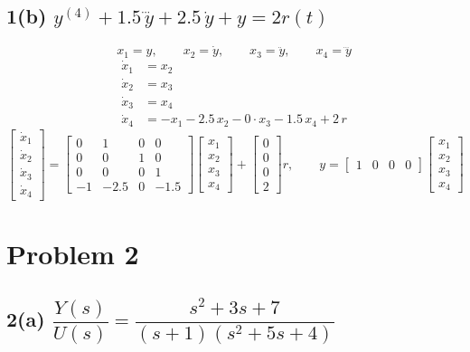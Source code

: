 \documentclass[11pt]{article}
\begin{document}
\subsection*{1(b) \quad $y^{(4)} + 1.5\,\dddot{y} + 2.5\,\dot{y} + y = 2r(t)$}

\[
x_1 = y, \qquad x_2 = \dot{y}, \qquad x_3 = \ddot{y}, \qquad x_4 = \dddot{y}
\]
\begin{align*}
\dot{x}_1 &= x_2\\
\dot{x}_2 &= x_3\\
\dot{x}_3 &= x_4\\
\dot{x}_4 &= -x_1 - 2.5\,x_2 - 0\cdot x_3 - 1.5\,x_4 + 2\,r
\end{align*}
\[
\begin{bmatrix}\dot{x}_1\\ \dot{x}_2\\ \dot{x}_3\\ \dot{x}_4\end{bmatrix}
=
\begin{bmatrix}0 & 1 & 0 & 0\\ 0 & 0 & 1 & 0\\ 0 & 0 & 0 & 1\\ -1 & -2.5 & 0 & -1.5\end{bmatrix}
\begin{bmatrix}x_1\\ x_2\\ x_3\\ x_4\end{bmatrix}
+
\begin{bmatrix}0\\ 0\\ 0\\ 2\end{bmatrix} r,
\qquad
y = \begin{bmatrix}1 & 0 & 0 & 0\end{bmatrix}
\begin{bmatrix}x_1\\ x_2\\ x_3\\ x_4\end{bmatrix}
\]

\section*{Problem 2}

\subsection*{2(a) \quad $\dfrac{Y(s)}{U(s)} = \dfrac{s^2 + 3s + 7}{(s+1)(s^2+5s+4)}$}
\end{document}
